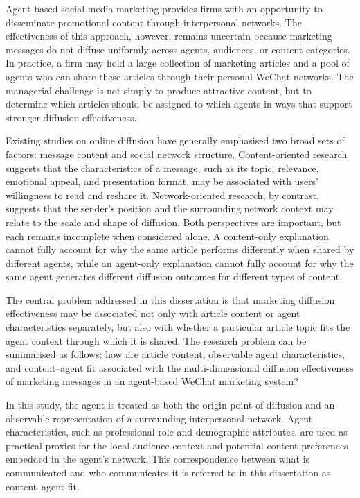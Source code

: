 Agent-based social media marketing provides firms with an opportunity to disseminate promotional content through interpersonal networks. The effectiveness of this approach, however, remains uncertain because marketing messages do not diffuse uniformly across agents, audiences, or content categories. In practice, a firm may hold a large collection of marketing articles and a pool of agents who can share these articles through their personal WeChat networks. The managerial challenge is not simply to produce attractive content, but to determine which articles should be assigned to which agents in ways that support stronger diffusion effectiveness.

Existing studies on online diffusion have generally emphasised two broad sets of factors: message content and social network structure. Content-oriented research suggests that the characteristics of a message, such as its topic, relevance, emotional appeal, and presentation format, may be associated with users' willingness to read and reshare it. Network-oriented research, by contrast, suggests that the sender's position and the surrounding network context may relate to the scale and shape of diffusion. Both perspectives are important, but each remains incomplete when considered alone. A content-only explanation cannot fully account for why the same article performs differently when shared by different agents, while an agent-only explanation cannot fully account for why the same agent generates different diffusion outcomes for different types of content.

The central problem addressed in this dissertation is that marketing diffusion effectiveness may be associated not only with article content or agent characteristics separately, but also with whether a particular article topic fits the agent context through which it is shared. The research problem can be summarised as follows: how are article content, observable agent characteristics, and content–agent fit associated with the multi-dimensional diffusion effectiveness of marketing messages in an agent-based WeChat marketing system?

In this study, the agent is treated as both the origin point of diffusion and an observable representation of a surrounding interpersonal network. Agent characteristics, such as professional role and demographic attributes, are used as practical proxies for the local audience context and potential content preferences embedded in the agent's network. This correspondence between what is communicated and who communicates it is referred to in this dissertation as content–agent fit.

